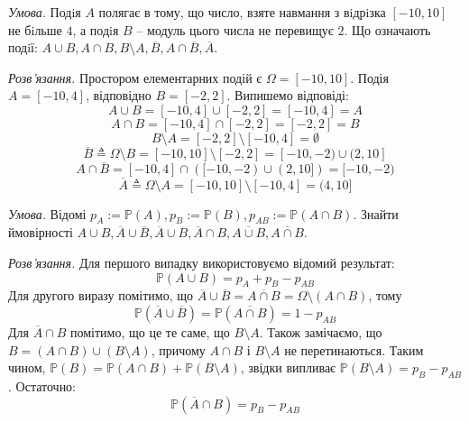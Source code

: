 \documentclass[oneside,solution]{karazin-prob-theory-assign}
\begin{document}

\hspace{20px}\textit{Умова.} Подiя $A$ полягає в тому, що число, взяте навмання з вiдрiзка $[-10, 10]$ не бiльше $4$, а подiя $B$ -- модуль цього числа не перевищує $2$. Що означають подiї: $A\cup B, A \cap B, B \setminus A, \overline{B},A \cap \overline{B},\overline{A}$.

\textit{Розв'язання.} Простором елементарних подій є $\Omega = [-10,10]$. Подія $A=[-10,4]$, відповідно $B=[-2,2]$. Випишемо відповіді:
\begin{equation}
    A \cup B = [-10,4] \cup [-2,2] = [-10,4] = A
\end{equation}
\begin{equation}
    A \cap B = [-10,4] \cap [-2,2] = [-2,2] = B
\end{equation}
\begin{equation}
    B \setminus A = [-2,2] \setminus [-10,4] = \emptyset
\end{equation}
\begin{equation}
    \overline{B} \triangleq \Omega \setminus B = [-10,10] \setminus [-2,2] = [-10,-2) \cup (2,10]
\end{equation}
\begin{equation}
    A \cap \overline{B} = [-10,4] \cap ([-10,-2) \cup (2,10]) = [-10,-2)
\end{equation}
\begin{equation}
    \overline{A} \triangleq \Omega \setminus A = [-10,10] \setminus [-10,4] = (4,10]
\end{equation}


\hspace{20px}\textit{Умова.} Відомі $p_A:=\mathbb{P}(A),p_B:=\mathbb{P}(B),p_{AB}:=\mathbb{P}(A \cap B)$. Знайти ймовірності $A \cup B,\overline{A} \cup \overline{B},\overline{A} \cup B,\overline{A} \cap B,\overline{A \cup B},\overline{A \cap B}$. 

\textit{Розв'язання.} Для першого випадку використовуємо відомий результат:
\begin{equation}
    \boxed{\mathbb{P}(A \cup B) = p_A + p_B - p_{AB}}
\end{equation}
Для другого виразу помітимо, що $\overline{A} \cup \overline{B} = \overline{A \cap B}=\Omega \setminus (A \cap B)$, тому
\begin{equation}
    \boxed{\mathbb{P}(\overline{A} \cup \overline{B}) = \mathbb{P}(\overline{A \cap B}) = 1 - p_{AB}}
\end{equation}
Для $\overline{A} \cap B$ помітимо, що це те саме, що $B \setminus A$. Також замічаємо, що $B = (A \cap B) \cup (B \setminus A)$, причому $A \cap B$ і $B \setminus A$ не перетинаються. Таким чином, $\mathbb{P}(B) = \mathbb{P}(A \cap B) + \mathbb{P}(B \setminus A)$, звідки випливає $\mathbb{P}(B \setminus A) = p_B-p_{AB}$. Остаточно:
\begin{equation}
    \boxed{\mathbb{P}(\overline{A} \cap B) = p_B - p_{AB}}
\end{equation}
\end{document}
